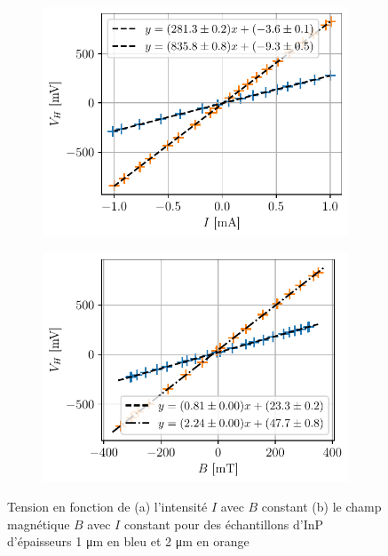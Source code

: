 \begin{figure}[h]
    \centering
    \begin{subfigure}{0.5\textwidth}
        \centering
        \includegraphics[width=\textwidth]{figures/U(I).pdf}
        \caption{}
        \label{fig:inpV(I)}
    \end{subfigure}%
    \begin{subfigure}{0.5\textwidth}
        \centering
        \includegraphics[width=\textwidth]{figures/U(B).pdf}
        \caption{}
        \label{fig:inpV(B)}
    \end{subfigure}
    \caption{Tension en fonction de (a) l'intensité \(I\) avec \(B\) constant (b) le champ magnétique \(B\) avec \(I\) constant pour des échantillons d'InP d'épaisseurs 1 \si{\micro\meter} en bleu et 2 \si{\micro\meter} en orange}
\end{figure}

